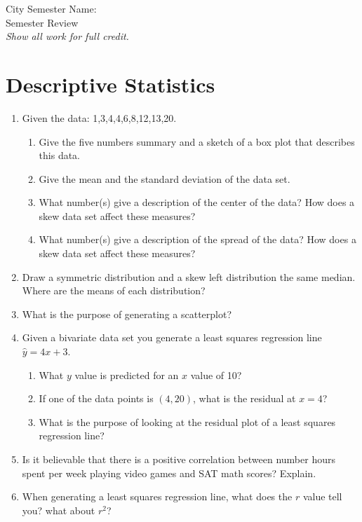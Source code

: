 \documentclass[12pt]{article}
\theoremstyle{plain}     %
\begin{document}
\large
City Semester  \hspace{8cm} Name:\makebox[6cm]{\hrulefill}
\\
Semester Review\\
\normalsize 
\emph{Show all work for full credit.}
\section{Descriptive Statistics}
\begin{enumerate}
\item Given the data: 1,3,4,4,6,8,12,13,20. 
	\begin{enumerate}
		\item Give the five numbers summary and a sketch of a box plot that describes this data.
		\item Give the mean and the standard deviation of the data set.
		\item What number(s) give a description of the center of the data? How does a skew data set affect these measures?
		\item What number(s) give a description of the spread of the data? How does a skew data set affect these measures?
	\end{enumerate}
	\item Draw a symmetric distribution and a skew left distribution the same median. Where are the means of each distribution?
	\item What is the purpose of generating a scatterplot?
	\item Given a bivariate data set you generate a least squares regression line $\hat{y}=4x+3$.
		\begin{enumerate}
			\item What $y$ value is predicted for an $x$ value of 10?
			\item If one of the data points is $(4,20)$, what is the residual at $x=4$?
			\item What is the purpose of looking at the residual plot of a least squares regression line?
		\end{enumerate}
		\item Is it believable that there is a positive correlation between number hours spent per week playing video games and SAT math scores? Explain.
		\item When generating a least squares regression line, what does the $r$ value tell you? what about $r^2$?
		
\end{enumerate}
\end{document}
